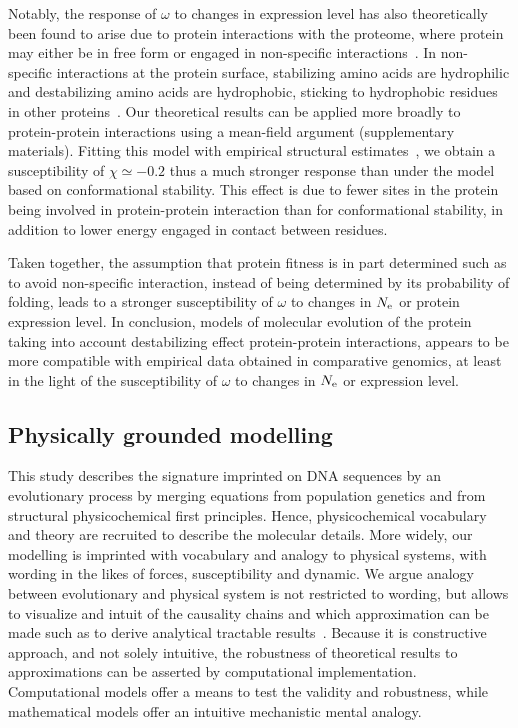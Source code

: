 Notably, the response of $\omega$ to changes in expression level has also theoretically been found to arise due to protein interactions with the proteome, where protein may either be in free form or engaged in non-specific interactions~\citep{Yang2012, Zhang2013}.
In non-specific interactions at the protein surface, stabilizing amino acids are hydrophilic and destabilizing amino acids are hydrophobic, sticking to hydrophobic residues in other proteins~\citep{Dixit2013,Manhart2015}.
Our theoretical results can be applied more broadly to protein-protein interactions using a mean-field argument (supplementary materials).
Fitting this model with empirical structural estimates~\citep{Janin1995a, Zhang2008}, we obtain a susceptibility of $\chi \simeq -0.2$ thus a much stronger response than under the model based on conformational stability.
This effect is due to fewer sites in the protein being involved in protein-protein interaction than for conformational stability, in addition to lower energy engaged in contact between residues.

Taken together, the assumption that protein fitness is in part determined such as to avoid non-specific interaction, instead of being determined by its probability of folding, leads to a stronger susceptibility of $\omega$ to changes in $N_{\mathrm{e}}$ or protein expression level.
In conclusion, models of molecular evolution of the protein taking into account destabilizing effect protein-protein interactions, appears to be more compatible with empirical data obtained in comparative genomics, at least in the light of the susceptibility of $\omega$ to changes in $N_{\mathrm{e}}$ or expression level.

\subsection{Physically grounded modelling}
This study describes the signature imprinted on \acrshort{DNA} sequences by an evolutionary process by merging equations from population genetics and from structural physicochemical first principles.
Hence, physicochemical vocabulary and theory are recruited to describe the molecular details.
More widely, our modelling is imprinted with vocabulary and analogy to physical systems, with wording in the likes of forces, susceptibility and dynamic.
We argue analogy between evolutionary and physical system is not restricted to wording, but allows to visualize and intuit of the causality chains and which approximation can be made such as to derive analytical tractable results~\citep{Sella2005, Mustonen2009, Bastolla2012, Bastolla2017}.
Because it is constructive approach, and not solely intuitive, the robustness of theoretical results to approximations can be asserted by computational implementation.
Computational models offer a means to test the validity and robustness, while mathematical models offer an intuitive mechanistic mental analogy.

